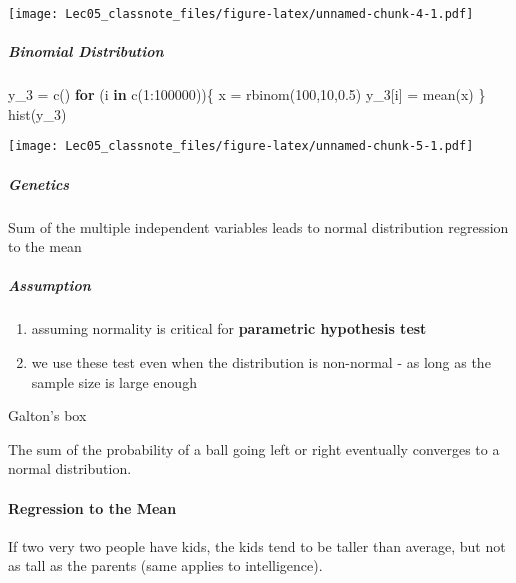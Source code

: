 \documentclass[
]{article}
\newenvironment{Shaded}{\begin{snugshade}}{\end{snugshade}}
\newcommand{\ControlFlowTok}[1]{\textcolor[rgb]{0.13,0.29,0.53}{\textbf{#1}}}
\newcommand{\DecValTok}[1]{\textcolor[rgb]{0.00,0.00,0.81}{#1}}
\newcommand{\FloatTok}[1]{\textcolor[rgb]{0.00,0.00,0.81}{#1}}
\newcommand{\FunctionTok}[1]{\textcolor[rgb]{0.00,0.00,0.00}{#1}}
\newcommand{\NormalTok}[1]{#1}
\newcommand{\OtherTok}[1]{\textcolor[rgb]{0.56,0.35,0.01}{#1}}
\newcommand{\SpecialCharTok}[1]{\textcolor[rgb]{0.00,0.00,0.00}{#1}}
\providecommand{\tightlist}{%
  \setlength{\itemsep}{0pt}\setlength{\parskip}{0pt}}
\begin{document}
\texttt{[image: Lec05\_classnote\_files/figure-latex/unnamed-chunk-4-1.pdf]}

\hypertarget{binomial-distribution}{%
\subparagraph{Binomial Distribution}\label{binomial-distribution}}

\begin{Shaded}
\begin{Highlighting}[]
\NormalTok{y\_3 }\OtherTok{=} \FunctionTok{c}\NormalTok{()}
\ControlFlowTok{for}\NormalTok{ (i }\ControlFlowTok{in} \FunctionTok{c}\NormalTok{(}\DecValTok{1}\SpecialCharTok{:}\DecValTok{100000}\NormalTok{))\{}
\NormalTok{  x }\OtherTok{=} \FunctionTok{rbinom}\NormalTok{(}\DecValTok{100}\NormalTok{,}\DecValTok{10}\NormalTok{,}\FloatTok{0.5}\NormalTok{)}
\NormalTok{  y\_3[i] }\OtherTok{=} \FunctionTok{mean}\NormalTok{(x)}
\NormalTok{\}}
\FunctionTok{hist}\NormalTok{(y\_3)}
\end{Highlighting}
\end{Shaded}

\texttt{[image: Lec05\_classnote\_files/figure-latex/unnamed-chunk-5-1.pdf]}

\hypertarget{genetics}{%
\subparagraph{Genetics}\label{genetics}}

Sum of the multiple independent variables leads to normal distribution
regression to the mean

\hypertarget{assumption}{%
\subparagraph{Assumption}\label{assumption}}

\begin{enumerate}
\def\labelenumi{\arabic{enumi}.}
\tightlist
\item
  assuming normality is critical for \textbf{parametric hypothesis test}
\item
  we use these test even when the distribution is non-normal - as long
  as the sample size is large enough
\end{enumerate}

Galton's box

The sum of the probability of a ball going left or right eventually
converges to a normal distribution.

\hypertarget{regression-to-the-mean}{%
\paragraph{Regression to the Mean}\label{regression-to-the-mean}}

If two very two people have kids, the kids tend to be taller than
average, but not as tall as the parents (same applies to intelligence).
\end{document}
